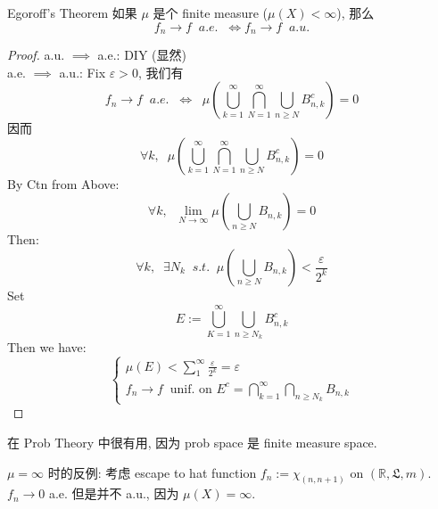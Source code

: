 \documentclass[lang=cn,11pt]{elegantbook}
\begin{document}
\begin{theorem}{Egoroff's Theorem}
\label{Egoroff's Theorem}
如果 $\mu$ 是个 finite measure ($\mu(X) < \infty$), 那么 
\[
f_n \rightarrow f \;\;a.e. \;\; \Longleftrightarrow f_n \rightarrow f \;\; a.u.
\]
\end{theorem}
\begin{proof}
    a.u. $\implies$ a.e.: DIY (显然)\\
    a.e. $\implies$ a.u.: Fix $\varepsilon > 0$, 我们有 \[
    f_n \rightarrow f \;\; a.e. \;\; \Longleftrightarrow \;\; \mu( \bigcup_{k=1}^\infty \bigcap_{N=1}^\infty \bigcup_{n \geq N} B_{n,k}^c)  = 0
    \]
    因而 \[
    \forall k, \;\; \mu( \bigcup_{k=1}^\infty \bigcap_{N=1}^\infty \bigcup_{n \geq N} B_{n,k}^c) =0 
    \]
    By Ctn from Above: \[
    \forall k,\;\;  \lim_{N\rightarrow \infty} \mu(\bigcup_{n\geq N} B_{n,k}) = 0
    \]
    Then: \[
    \forall k,\;\; \exists N_k \;\;s.t. \;\;  \mu(\bigcup_{n\geq N} B_{n,k}) < \frac{\varepsilon}{2^k}
    \]
    Set\[
    E:= \bigcup_{K=1}^\infty \bigcup_{n\geq N_k} B_{n,k}^c
    \]
    Then we have: \[
    \begin{cases}
        \mu(E) < \sum_{1}^\infty \frac{\varepsilon}{2^k} = \varepsilon \\
        f_n \rightarrow f \;\;\text{unif. on } E^c = \bigcap_{k=1}^\infty \bigcap_{n\geq N_k} B_{n,k}
    \end{cases}
    \]
\end{proof}
\begin{remark}
    在 Prob Theory 中很有用, 因为 prob space 是 finite measure space.
\end{remark}

\begin{example}
   $\mu = \infty$ 时的反例: 考虑 escape to hat function $f_n := \chi_{(n,n+1)}$ on $(\mathbb{R}, \mathfrak{L},m)$.\\
    $f_n \rightarrow 0$ a.e. 但是并不 a.u., 因为 $\mu(X) = \infty$.
\end{example}
\end{document}
